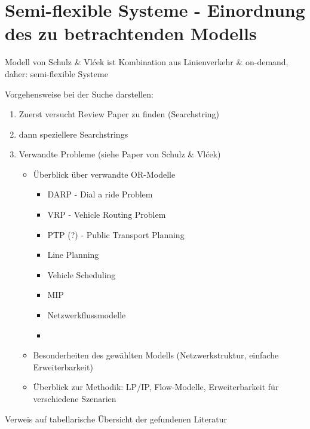 
\section{Semi-flexible Systeme - Einordnung des zu betrachtenden Modells}
\label{sec:Einordnung}
\label{sec:2.2}
Modell von Schulz \& Vlćek ist Kombination aus Linienverkehr \& on-demand, daher: semi-flexible Systeme

\vspace{1em}

Vorgehensweise bei der Suche darstellen:
\begin{enumerate}
    \item Zuerst versucht Review Paper zu finden (Searchstring) 
    \item dann speziellere Searchstrings
    \item Verwandte Probleme (siehe Paper von Schulz \& Vlćek)
    \begin{itemize}
        \item Überblick über verwandte OR-Modelle
        \begin{itemize}
            \item DARP - Dial a ride Problem
            \item VRP - Vehicle Routing Problem
            \item PTP (?) - Public Transport Planning
            \item Line Planning
            \item Vehicle Scheduling
            \item MIP
            \item Netzwerkflussmodelle
            \item 
        \end{itemize}
        \item Besonderheiten des gewählten Modells (Netzwerkstruktur, einfache Erweiterbarkeit)
        \item Überblick zur Methodik: LP/IP, Flow-Modelle, Erweiterbarkeit für verschiedene Szenarien
    \end{itemize}
\end{enumerate}

Verweis auf tabellarische Übersicht der gefundenen Literatur %

